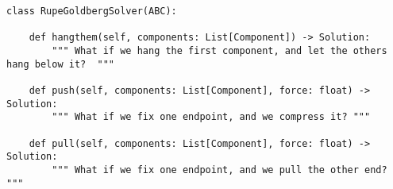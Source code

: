 \par\begin{minipage}{87ex}
\begin{verbatim}
class RupeGoldbergSolver(ABC):

    def hangthem(self, components: List[Component]) -> Solution:
        """ What if we hang the first component, and let the others hang below it?  """

    def push(self, components: List[Component], force: float) -> Solution:
        """ What if we fix one endpoint, and we compress it? """

    def pull(self, components: List[Component], force: float) -> Solution:
        """ What if we fix one endpoint, and we pull the other end? """
\end{verbatim}
\end{minipage}\par